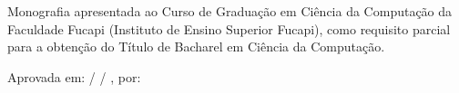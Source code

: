 \documentclass[
	12pt,				%
	openright,			%
	oneside,	
	a4paper,				%
	english,				%
	brazil				%
]{abntex2/abntex2} %
\begin{document}
\begin{folhadeaprovacao}
	\parindent=0pt
	\setlength{\ABNTEXsignskip}{1.5cm}
	
	\begin{center}
		
		{\fontsize{12}{15}\selectfont\imprimirautor}
		\vspace*{\fill}
		\begin{center}
			\fontsize{12}{15}\selectfont\imprimirtitulo
		\end{center}
		\vspace*{\fill}
	\end{center}	

	Monografia apresentada ao Curso de Graduação em Ciência da Computação da Faculdade Fucapi (Instituto de Ensino Superior Fucapi), como requisito parcial para a obtenção do Título de Bacharel em Ciência da Computação.
	
	Aprovada em:       /      /            , por:

	\vspace{1cm}

	\vspace{1cm}
	\vfill
    
	\begin{center}
		\fontsize{12}{15}\selectfont
		\vspace*{0.5cm}
		\imprimirlocal
		\\
		\imprimirdata
		\vspace*{1cm}
	\end{center}
  
 \end{folhadeaprovacao}
\end{document}
